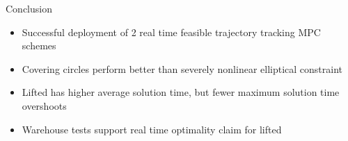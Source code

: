 \documentclass[10pt,aspectratio=1610]{beamer} %
\begin{document}

\begin{frame}{Conclusion}
	\begin{itemize}[label=\textbullet]
	\item Successful deployment of 2 real time feasible trajectory tracking MPC schemes
	\item Covering circles perform better than severely nonlinear elliptical constraint
	\item Lifted has higher average solution time, but fewer maximum solution time overshoots
	\item Warehouse tests support real time optimality claim for lifted
	\end{itemize}
\end{frame}
\end{document}
